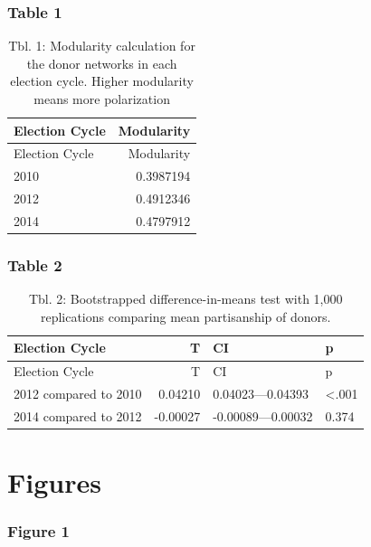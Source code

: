 \documentclass[12pt,]{article}
\begin{document}
\hypertarget{table-1}{%
\subsubsection{Table 1}\label{table-1}}

\begin{longtable}[]{@{}lr@{}}
\caption{Tbl. 1: Modularity calculation for the donor networks in each
election cycle. Higher modularity means more
polarization}\tabularnewline
\toprule
Election Cycle & Modularity\tabularnewline
\midrule
\endfirsthead
\toprule
Election Cycle & Modularity\tabularnewline
\midrule
\endhead
2010 & 0.3987194\tabularnewline
2012 & 0.4912346\tabularnewline
2014 & 0.4797912\tabularnewline
\bottomrule
\end{longtable}

\newpage

\hypertarget{table-2}{%
\subsubsection{Table 2}\label{table-2}}

\begin{longtable}[]{@{}lrll@{}}
\caption{Tbl. 2: Bootstrapped difference-in-means test with 1,000
replications comparing mean partisanship of donors.}\tabularnewline
\toprule
Election Cycle & T & CI & p\tabularnewline
\midrule
\endfirsthead
\toprule
Election Cycle & T & CI & p\tabularnewline
\midrule
\endhead
2012 compared to 2010 & 0.04210 & 0.04023---0.04393 &
\textless.001\tabularnewline
2014 compared to 2012 & -0.00027 & -0.00089---0.00032 &
0.374\tabularnewline
\bottomrule
\end{longtable}

\newpage

\hypertarget{figures}{%
\section{Figures}\label{figures}}

\hypertarget{figure-1}{%
\subsubsection{Figure 1}\label{figure-1}}
\end{document}
